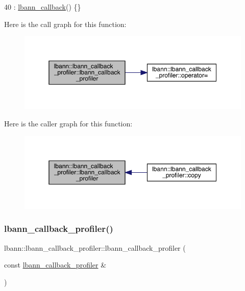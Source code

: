 \begin{DoxyCode}
40 : \hyperlink{classlbann_1_1lbann__callback_a679057298a41ddd47f08c157f756c584}{lbann\_callback}() \{\}
\end{DoxyCode}
Here is the call graph for this function\+:\nopagebreak
\begin{figure}[H]
\begin{center}
\leavevmode
\includegraphics[width=350pt]{classlbann_1_1lbann__callback__profiler_aa1df0f5400362d0b4c469df5d4657eed_cgraph}
\end{center}
\end{figure}
Here is the caller graph for this function\+:\nopagebreak
\begin{figure}[H]
\begin{center}
\leavevmode
\includegraphics[width=350pt]{classlbann_1_1lbann__callback__profiler_aa1df0f5400362d0b4c469df5d4657eed_icgraph}
\end{center}
\end{figure}
\mbox{\label{classlbann_1_1lbann__callback__profiler_ad55c2dd945f3867ae984ff94e761b05a}} 
\subsubsection{\texorpdfstring{lbann\+\_\+callback\+\_\+profiler()}{lbann\_callback\_profiler()}\hspace{0.1cm}{\footnotesize\ttfamily [2/2]}}
{\footnotesize\ttfamily lbann\+::lbann\+\_\+callback\+\_\+profiler\+::lbann\+\_\+callback\+\_\+profiler (\begin{DoxyParamCaption}\item[{const \hyperlink{classlbann_1_1lbann__callback__profiler}{lbann\+\_\+callback\+\_\+profiler} \&}]{ }\end{DoxyParamCaption})\hspace{0.3cm}{\ttfamily [default]}}



